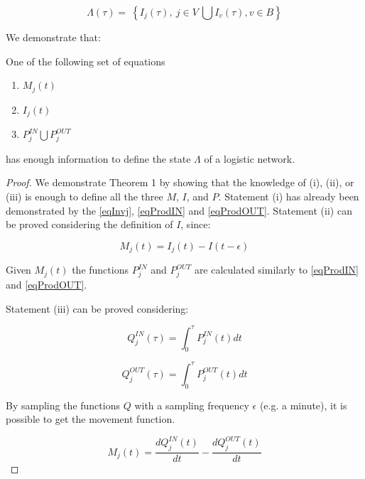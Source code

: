 \begin{equation}
\Lambda\left(\tau\right)=\ \left\{I_j\left(\tau\right),\ j\in V\ \bigcup{I_v\left(\tau\right),v\in}B\right\}
\label{eq_stateLambda}
\end{equation}

We demonstrate that:

\begin{theorem} \label{theor_MIP}
One of the following set of equations 
\begin{enumerate}[label=(\roman*)]
    \item $M_j(t)$
    \item $I_j(t)$
    \item $P_j^{IN} \bigcup P_j^{OUT} $
\end{enumerate}
has enough information to define the state $\Lambda$ of a logistic network. 
\end{theorem}

\begin{proof}

We demonstrate Theorem 1 by showing that the knowledge of (i), (ii), or (iii) is enough to define all the three $M$, $I$, and $P$. Statement (i) has already been demonstrated by the \ref{eqInvj}, \ref{eqProdIN} and \ref{eqProdOUT}. Statement (ii) can be proved considering the definition of $I$, since:


\begin{equation}
M_j(t)=I_j(t)-I(t-\epsilon) 
\label{eqThPart2}
\end{equation}

Given $M_j (t)$ the functions $P_j^{IN}$ and $P_j^{OUT}$ are calculated similarly to \ref{eqProdIN} and \ref{eqProdOUT}. \par
Statement (iii) can be proved considering:

\begin{equation}
Q_j^{IN} (\tau)=\int_0^\tau P_j^{IN}(t)dt
\label{eqThPart3IN}
\end{equation}

\begin{equation}
Q_j^{OUT} (\tau)=\int_0^\tau P_j^{OUT}(t)dt
\label{eqThPart3OUT}
\end{equation}

By sampling the functions $Q$ with a sampling frequency $\epsilon$ (e.g. a minute), it is possible to get the movement function.

\begin{equation}
M_j(t)=\frac{dQ_j^{IN}(t)}{dt} - \frac{dQ_j^{OUT}(t)}{dt}
\label{eqThPart3Mov}
\end{equation}

\end{proof}

